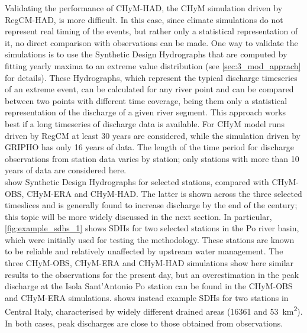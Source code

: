 Validating the performance of CHyM-HAD, the CHyM simulation driven by RegCM-HAD, is more difficult.
In this case, since climate simulations do not represent real timing of the events, but rather only a statistical representation of it, no direct comparison with observations can be made.
One way to validate the simulations is to use the Synthetic Design Hydrographs that are computed by fitting yearly maxima to an extreme value distribution (see \cref{sec:3_mod_apprach} for details).
These Hydrographs, which represent the typical discharge timeseries of an extreme event, can be calculated for any river point and can be compared between two points with different time coverage, being them only a statistical representation of the discharge of a given river segment.
This approach works best if a long timeseries of discharge data is available.
For CHyM model runs driven by RegCM at least 30 years are considered, while the simulation driven by GRIPHO has only 16 years of data.
The length of the time period for discharge observations from station data varies by station; only stations with more than 10 years of data are considered here.\\
 show Synthetic Design Hydrographs for selected stations, compared with CHyM-OBS, CHyM-ERA and CHyM-HAD.
The latter is shown across the three selected timeslices and is generally found to increase discharge by the end of the century; this topic will be more widely discussed in the next section.
In particular, \cref{fig:example_sdhs_1} shows SDHs for two selected stations in the Po river basin, which were initially used for testing the methodology. These stations are known to be reliable and relatively unaffected by upstream water management.
The three CHyM-OBS, CHyM-ERA and CHyM-HAD simulations show here similar results to the observations for the present day, but an overestimation in the peak discharge at the Isola Sant'Antonio Po station can be found in the CHyM-OBS and CHyM-ERA simulations.
 shows instead example SDHs for two stations in Central Italy, characterised by widely different drained areas (16361 and \SI{53}{\kilo\meter\squared}).
In both cases, peak discharges are close to those obtained from observations.\\
